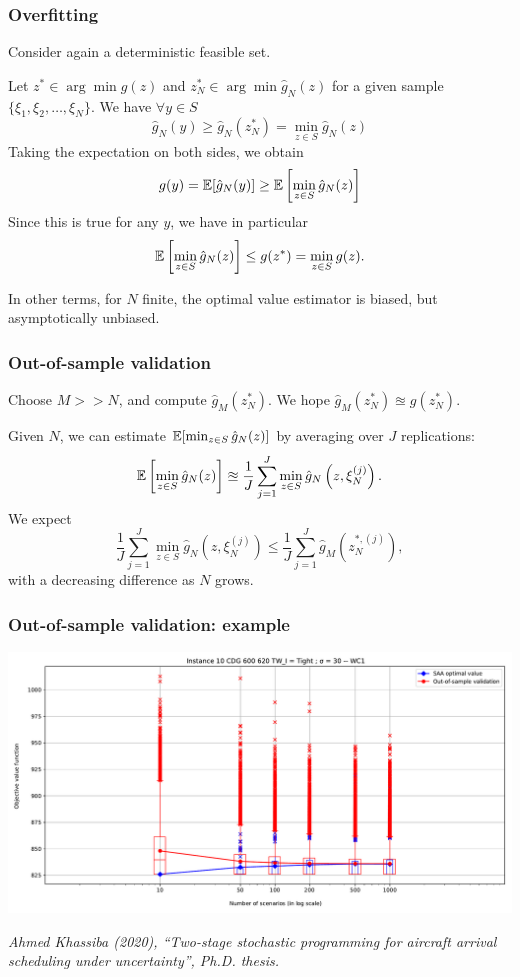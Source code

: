 \documentclass{beamer}
\begin{document}
\begin{frame}
\frametitle{Overfitting}

Consider again a deterministic feasible set.

\mbox{}

Let $z^* \in \arg\min g(z)$ and $z^*_N  \in \arg\min \hat{g}_N (z)$  for a given sample $\lbrace \xi_1, \xi_2, \ldots, \xi_N \rbrace$. We have $\forall y \in S$
$$
\hat{g}_N(y) \geq \hat{g}_N(z^*_N) = \min_{z \in S} \hat{g}_N(z)
$$
Taking the expectation on both sides, we obtain
$$
g(y) = {\mathbb{E}}[\hat{g}_N(y)] \geq  {\mathbb{E}}\left[ \min_{z \in S} \hat{g}_N(z) \right]
$$
Since this is true for any $y$, we have in particular
$$
{\mathbb{E}}\left[ \min_{z \in S} \hat{g}_N(z) \right] \leq g(z^*) = \min_{z \in S} g(z).
$$

\mbox{}

In other terms, for $N$ finite, the optimal value estimator is biased, but asymptotically unbiased.

\end{frame}

\begin{frame}
\frametitle{Out-of-sample validation}

Choose $M >> N$, and compute $\hat{g}_M(z_N^*)$. We hope $\hat{g}_M(z_N^*) \approxeq g(z_N^*)$.

\mbox{}

Given $N$, we can estimate ${\mathbb{E}}[\min_{z \in S} \hat{g}_N(z)]$ by averaging over $J$ replications:
$$
{\mathbb{E}}\left[\min_{z \in S} \hat{g}_N(z)\right] \approxeq \frac{1}{J} \sum_{j = 1}^J \min_{z \in S} \hat{g}_N\left(z, \xi_N^{(j)}\right).
$$
We expect
$$
\frac{1}{J} \sum_{j = 1}^J \min_{z \in S} \hat{g}_N\left(z, \xi_N^{(j)}\right) \leq 
\frac{1}{J} \sum_{j = 1}^J \hat{g}_M\left(z_N^{*,(j)}\right),
$$
with a decreasing difference as $N$ grows.

\end{frame}

\begin{frame}
\frametitle{Out-of-sample validation: example}

\begin{center}
\includegraphics[width=\textwidth]{imgs/instance_landing.pdf}
\end{center}
\begin{small}
\textit{Ahmed Khassiba (2020), ``Two-stage stochastic programming for aircraft arrival scheduling under uncertainty'', Ph.D. thesis.}
\end{small}

\end{frame}
\end{document}
